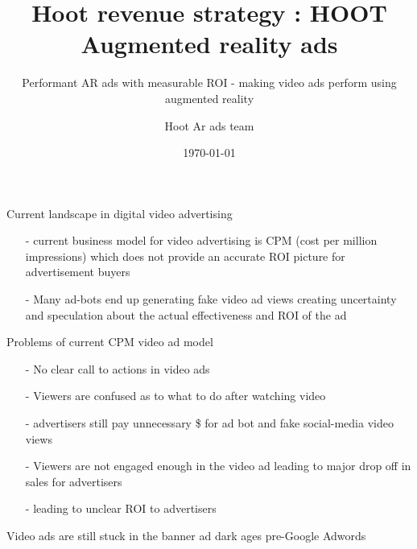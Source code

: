 \documentclass[12pt]{beamer}
\title{ Hoot revenue strategy : HOOT Augmented reality ads}
\subtitle{Performant AR ads with measurable ROI  - making video ads perform using augmented reality}
\date{\today}
\author{Hoot Ar ads team}
\institute{Hoot Live inc., a Delaware C-corp}
\begin{document}
\maketitle



\begin{frame}[fragile]{Current landscape in digital video advertising }

\begin{itemize}
\item[-]current business model for video advertising is CPM (cost per million impressions) which does not provide an accurate ROI picture for advertisement buyers
  \pause
\item[-]Many ad-bots end up generating fake video ad views creating uncertainty and speculation about the actual effectiveness and ROI of the ad
\end{itemize}

\end{frame}
\begin{frame}[t]{Problems of current CPM video ad model}
\begin{itemize}
\item[-]No clear call to actions in video ads
\pause
\item[-]Viewers are confused as to what to do after watching video
\pause
\item[-]advertisers still pay unnecessary \$ for ad bot  and fake social-media video views
\pause
\item[-]Viewers are not engaged enough in the video ad leading to  major drop off in sales for advertisers
\pause
\item[-]leading to unclear ROI to advertisers
\end{itemize}
\pause
Video ads are still stuck in the banner ad dark ages pre-Google Adwords

\end{frame}
\end{document}
